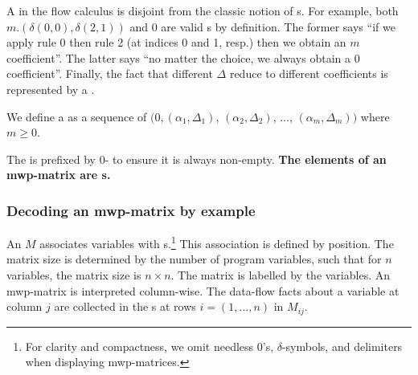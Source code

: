 \noindent
A  in the flow calculus is disjoint from the classic notion of
s. For example, both \(m.(\delta(0,0),\delta(2,1))\)
and \(0\) are valid s by definition. The former says
\enquote{if we apply rule 0 then rule 2 (at indices 0 and 1, resp.) then we
obtain an \(m\) coefficient}. The latter says \enquote{no matter the
choice, we always obtain a \(0\) coefficient}. Finally, the fact
that different \(\Delta\) reduce to different
coefficients is represented by a \emph{}.

\begin{definition}
We define a  as a sequence of 
\(\big(0,(\alpha_1,\Delta_1)\), \((\alpha_2,\Delta_2)\), \(\dots\), \((\alpha_m,
\Delta_m)\big)\) where \(m \geq 0\).
\end{definition}

\noindent The  is prefixed by
\(0\)- to ensure it is always non-empty. \textbf{The
elements of an mwp-matrix are s.}

\subsubsection{Decoding an mwp-matrix by example}
\label{subsec:read-mat}

An  \(M\) associates variables with
s.\footnote{ For clarity and compactness, we omit
needless \(0\)'s, \(\delta\)-symbols, and delimiters
when displaying mwp-matrices.} This association is defined by position. The
matrix size is determined by the number of program variables, such that for
\(n\) variables, the matrix size is \(n \times n\). The matrix is labelled by
the variables. An mwp-matrix is interpreted {column-wise}. The data-flow facts
about a variable at column \(j\) are collected in the s at rows \(i=(1, \ldots, n)\) in \(M_{ij}\).


